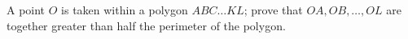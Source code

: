 \documentclass[]{article}
\begin{document}
\noindent
A point $O$ is taken within a polygon $ABC \dots KL$;
prove that $OA, OB, \dots, OL$ are together greater than 
half the perimeter of the polygon.
\end{document}

